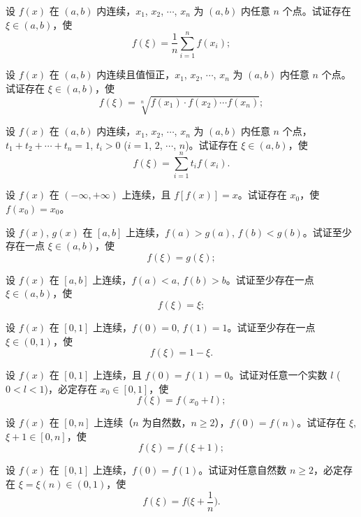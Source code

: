 	\begin{ti}
		\begin{xiaoti}
			\item 设 $f(x)$ 在 $(a,b)$ 内连续，$x_1$, $x_2$, $\cdots$, $x_n$ 为 $(a,b)$ 内任意 $n$ 个点。试证存在 $\xi \in (a,b)$，使
			\[ f(\xi) = \frac{1}{n} \sum_{i=1}^n f(x_i); \]
			\item 设 $f(x)$ 在 $(a,b)$ 内连续且值恒正，$x_1$, $x_2$, $\cdots$, $x_n$ 为 $(a,b)$ 内任意 $n$ 个点。试证存在 $\xi \in (a,b)$，使
			\[ f(\xi) = \sqrt[n]{f(x_1) \cdot f(x_2) \cdots f(x_n)}; \]
			\item 设 $f(x)$ 在 $(a,b)$ 内连续，$x_1$, $x_2$, $\cdots$, $x_n$ 为 $(a,b)$ 内任意 $n$ 个点，$t_1 + t_2 + \cdots \allowbreak + t_n = 1$, $t_i > 0$ ($i=1$, $2$, $\cdots$, $n$)。试证存在 $\xi \in (a,b)$，使
			\[ f(\xi) = \sum_{i=1}^n t_i f(x_i). \]
		\end{xiaoti}
	\end{ti}

	\begin{ti}
		设 $f(x)$ 在 $(-\infty,+\infty)$ 上连续，且 $f[f(x)] = x$。试证存在 $x_0$，使 $f(x_0) = x_0$。
	\end{ti}

	\begin{ti}
		\begin{xiaoti}
			\item 设 $f(x)$, $g(x)$ 在 $[a,b]$ 上连续，$f(a) > g(a)$, $f(b) < g(b)$。试证至少存在一点 $\xi \in (a,b)$，使
			\[ f(\xi) = g(\xi); \]
			\item 设 $f(x)$ 在 $[a,b]$ 上连续，$f(a) < a$, $f(b) > b$。试证至少存在一点 $\xi \in (a,b)$，使
			\[ f(\xi) = \xi; \]
			\item 设 $f(x)$ 在 $[0,1]$ 上连续，$f(0) = 0$, $f(1) = 1$。试证至少存在一点 $\xi \in (0,1)$，使
			\[ f(\xi) = 1 - \xi. \]
		\end{xiaoti}
	\end{ti}

	\begin{ti}
		\begin{xiaoti}
			\item 设 $f(x)$ 在 $[0,1]$ 上连续，且 $f(0) = f(1) = 0$。试证对任意一个实数 $l$ ($0<l<1$)，必定存在 $x_0 \in [0,1]$，使
			\[ f(\xi) = f(x_0 + l); \]
			\item 设 $f(x)$ 在 $[0,n]$ 上连续（$n$ 为自然数，$n \geq 2$），$f(0) = f(n)$。试证存在 $\xi$, $\xi + 1 \in [0,n]$，使
			\[ f(\xi) = f(\xi + 1); \]
			\item 设 $f(x)$ 在 $[0,1]$ 上连续，$f(0) = f(1)$。试证对任意自然数 $n \geq 2$，必定存在 $\xi = \xi(n) \in (0,1)$，使
			\[ f(\xi) = f\biggl( \xi + \frac{1}{n} \biggr). \]
		\end{xiaoti}
	\end{ti}

